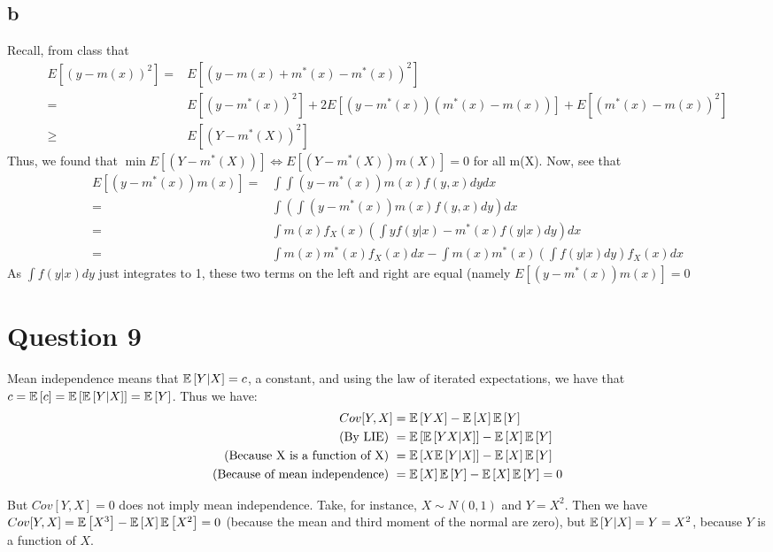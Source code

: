 \documentclass[12pt]{paper}
\begin{document}
\subsection*{b}
Recall, from class that 
\begin{align*}
    E[(y-m(x))^2] = & E[(y - m(x) + m^*(x) - m^*(x))^2] \\
    = & E[(y-m^*(x))^2] + 2E[(y-m^*(x))(m^*(x)-m(x))] + E[(m^*(x) - m(x))^2] \\ 
    \geq & E[(Y-m^*(X))^2]
\end{align*}
Thus, we found that $\min E[(Y-m^*(X))] \Leftrightarrow E[(Y-m^*(X))m(X)] = 0 $ for all m(X).
Now, see that 
\begin{align*}
    E[(y-m^*(x))m(x)] = & \int \int (y-m^*(x))m(x)f(y,x)dy dx \\
    = & \int (\int (y-m^*(x))m(x)f(y,x) dy) dx \\
    = & \int m(x) f_X(x) (\int y f(y|x) - m^*(x) f(y|x) dy) dx \\
    = & \int m(x) m^*(x) f_X (x) dx - \int m(x) m^*(x) (\int f(y|x) dy) f_X (x) dx 
    \end{align*}
As $\int f(y|x)dy$ just integrates to 1, these two terms on the left and right are equal (namely $E[(y-m^*(x))m(x)] =0$

\section*{Question 9}

Mean independence means that $\mathbb{E} \left [ Y|X \right ]=c$, a constant, and using the law of iterated expectations, we have that $c=\mathbb{E} \left [ c \right ]=\mathbb{E} \left [ \mathbb{E} \left [ Y|X \right ] \right ]=\mathbb{E} \left [ Y \right ]$. Thus we have:
\begin{equation}
\begin{split}
Cov[Y,X]&=\mathbb{E} \left [ YX \right ]-\mathbb{E} \left [ X \right ]\mathbb{E} \left [ Y \right ]\\
\text{(By LIE)  }&=\mathbb{E} \left [ \mathbb{E} \left [ YX|X \right ] \right ]-\mathbb{E} \left [ X \right ]\mathbb{E} \left [ Y \right ]\\
\text{(Because X is a function of X)  }&=\mathbb{E} \left [ X\mathbb{E} \left [ Y|X \right ] \right ]-\mathbb{E} \left [ X \right ]\mathbb{E} \left [ Y \right ]\\
\text{(Because of mean independence)  }&=\mathbb{E} \left [ X \right ]\mathbb{E} \left [ Y \right ]-\mathbb{E} \left [ X \right ]\mathbb{E} \left [ Y \right ]=0\\
\end{split}
\end{equation}

But $Cov[Y,X]=0$ does not imply mean independence. Take, for instance, $X\sim N(0,1)$ and $Y=X^2$. Then we have $Cov[Y,X]=\mathbb{E} \left [ X^3 \right ]-\mathbb{E} \left [ X \right ]\mathbb{E} \left [ X^2 \right ]=0$ (because the mean and third moment of the normal are zero), but $\mathbb{E} \left [ Y|X \right ]=Y=X^2$, because $Y$ is a function of $X$. 
\end{document}
